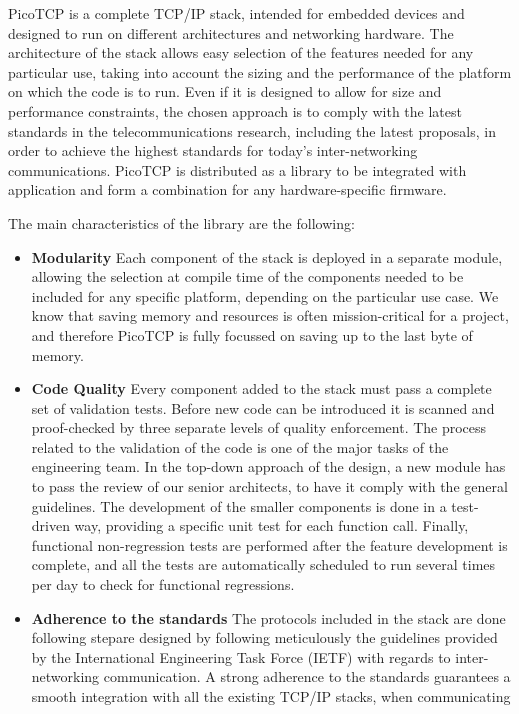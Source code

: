 PicoTCP is a complete TCP/IP stack, intended for embedded devices and
designed to run on different architectures and networking
hardware. The architecture of the stack allows easy selection of the features
needed for any particular use, taking into account the sizing and
the performance of the platform on which the code is to run.
Even if it is designed
to allow for size and performance constraints, the chosen approach is to
comply with the latest standards in the telecommunications research, including
the latest proposals, in order to achieve the highest standards for
today's inter-networking communications. PicoTCP is distributed as
a library to be integrated with application and form a combination for
any hardware-specific firmware.


The main characteristics of the library are the following:
\begin{itemize}
\item \textbf{Modularity} Each component of the stack is deployed in a
separate module, allowing the selection at compile time of the components needed to
be included for any specific platform, depending on the particular use case.
We know that saving memory and resources is often mission-critical for a
project, and therefore PicoTCP is fully focussed on saving
up to the last byte of memory.
\item \textbf{Code Quality} Every component added to the
stack must pass a complete set of validation tests. Before new code can be
introduced it is scanned and proof-checked by three separate levels of
quality enforcement. The process related to the validation of the code is
one of the major tasks of the engineering team. In the top-down approach of the design, a
new module has to pass the review of our senior architects, to have it comply
with the general guidelines. The development of the smaller
components is done in a test-driven way, providing a specific unit test for each function call.
Finally, functional non-regression tests are performed
after the feature development is complete, and all the tests are automatically
scheduled to run several times per day to check for functional regressions.
\item \textbf{Adherence to the standards} The protocols
included in the stack are done following stepare designed by following meticulously the guidelines
provided by the International Engineering Task Force (IETF) with regards to
inter-networking communication. A strong adherence to the standards guarantees a
smooth integration with all the existing TCP/IP stacks, when communicating

\end{itemize}

